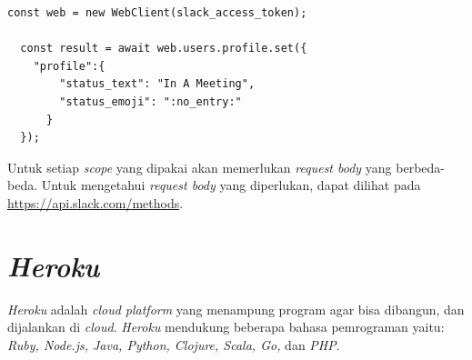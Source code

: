 \begin{lstlisting}
const web = new WebClient(slack_access_token);

  const result = await web.users.profile.set({
    "profile":{
        "status_text": "In A Meeting",
        "status_emoji": ":no_entry:"
      }
  });
\end{lstlisting}

Untuk setiap \textit{scope} yang dipakai akan memerlukan \textit{request body} yang berbeda-beda. Untuk mengetahui \textit{request body} yang diperlukan, dapat dilihat pada \url{https://api.slack.com/methods}. 

\section{\textit{Heroku}}
\textit{Heroku} adalah \textit{cloud platform} yang menampung program agar bisa dibangun, dan dijalankan di \textit{cloud}.\cite{heroku} \textit{Heroku} mendukung beberapa bahasa pemrograman yaitu: \textit{Ruby, Node.js, Java, Python, Clojure, Scala, Go, }dan \textit{PHP}. 
